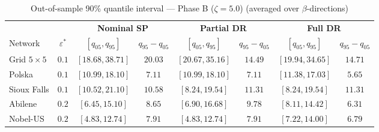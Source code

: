 \begin{table}[htbp]
\centering
\caption{Out-of-sample 90\% quantile interval — Phase B ($\zeta=5.0$) (averaged over $\beta$-directions)}
\label{tab:oos-zeta50}
\small
\setlength{\tabcolsep}{6pt}
\begin{tabular}{l c cc cc cc}
\toprule
& & \multicolumn{2}{c}{\textbf{Nominal SP}} & \multicolumn{2}{c}{\textbf{Partial DR}} & \multicolumn{2}{c}{\textbf{Full DR}} \\
\cmidrule(lr){3-4} \cmidrule(lr){5-6} \cmidrule(lr){7-8}
Network & $\varepsilon^{*}$ & $[q_{05}, q_{95}]$ & $q_{95} \!-\! q_{05}$ & $[q_{05}, q_{95}]$ & $q_{95} \!-\! q_{05}$ & $[q_{05}, q_{95}]$ & $q_{95} \!-\! q_{05}$ \\
\midrule
Grid $5 \times 5$ & $0.1$ & $[18.68, 38.71]$ & $20.03$ & $[20.67, 35.16]$ & $\mathbf{14.49}$ & $[19.94, \mathbf{34.65}]$ & $14.71$ \\
Polska & $0.1$ & $[10.99, 18.10]$ & $7.11$ & $[10.99, 18.10]$ & $7.11$ & $[11.38, \mathbf{17.03}]$ & $\mathbf{5.65}$ \\
Sioux Falls & $0.1$ & $[10.52, 21.10]$ & $\mathbf{10.58}$ & $[8.24, \mathbf{19.54}]$ & $11.31$ & $[8.24, \mathbf{19.54}]$ & $11.31$ \\
Abilene & $0.2$ & $[6.45, 15.10]$ & $8.65$ & $[6.90, 16.68]$ & $9.78$ & $[8.11, \mathbf{14.42}]$ & $\mathbf{6.31}$ \\
Nobel-US & $0.2$ & $[4.83, \mathbf{12.74}]$ & $7.91$ & $[4.83, \mathbf{12.74}]$ & $7.91$ & $[7.22, 14.00]$ & $\mathbf{6.79}$ \\
\bottomrule
\end{tabular}
\end{table}
